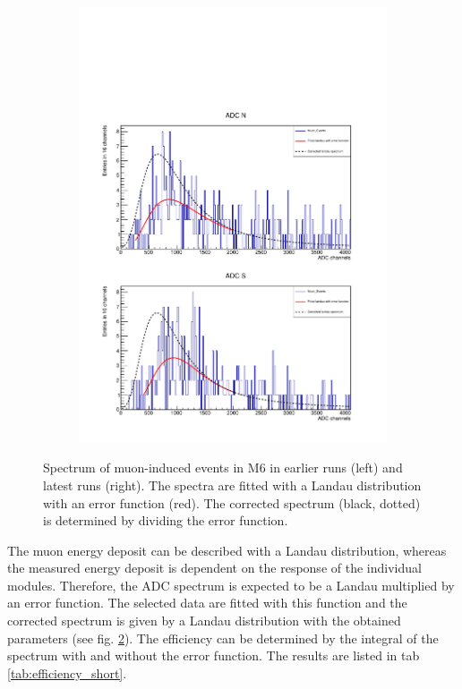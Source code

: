 \begin{figure}[h!]
\begin{subfigure}{0.5\linewidth}
    \includegraphics[width=\linewidth{}]{./fig/124M6CorrectedLandau.pdf}
    \caption{}
    \label{fig:landau_lateM6}
  \end{subfigure}
  \caption{Spectrum of muon-induced events in M6 in earlier runs (left) and latest runs (right). The spectra are fitted with a Landau distribution with an error function (red). The corrected spectrum (black, dotted) is determined by dividing the error function.}
  \label{fig:detection_M6}
\end{figure}

The muon energy deposit can be described with a Landau distribution, whereas the measured energy deposit is dependent on the response of the individual modules. Therefore, the ADC spectrum is expected to be a Landau multiplied by an error function. The selected data are fitted with this function and the corrected spectrum is given by a Landau distribution with the obtained parameters (see fig. \ref{fig:detection_M6}). The efficiency can be determined by the integral of the spectrum with and without the error function. The results are listed in tab \ref{tab:efficiency_short}.


